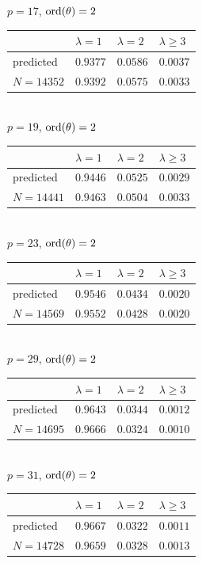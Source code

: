 \documentclass[pdflatex,sn-mathphys-num]{sn-jnl}%
\theoremstyle{plain}
\theoremstyle{definition}
\theoremstyle{remark}
\numberwithin{equation}{section}
\newcommand{\ord}{\text{\rm ord}}
\begin{document}
\noindent $p=17$, $\ord(\theta)=2$\\
\begin{tabular}{|l|l|l|l|} \hline
 & $\lambda=1$ & $\lambda=2$ & $\lambda \geq 3$ \\ \hline
predicted & $0.9377$ & $0.0586$ & $0.0037$ \\ \hline
$N=14352$ & $0.9392$ & $0.0575$ & $0.0033$ \\ \hline
\end{tabular}\\

\noindent $p=19$, $\ord(\theta)=2$\\
\begin{tabular}{|l|l|l|l|} \hline
 & $\lambda=1$ & $\lambda=2$ & $\lambda \geq 3$ \\ \hline
predicted &  $0.9446$ & $0.0525$ & $0.0029$ \\ \hline
$N=14441$ & $0.9463$ & $0.0504$ & $0.0033$ \\ \hline
\end{tabular}\\

\noindent $p=23$, $\ord(\theta)=2$\\
\begin{tabular}{|l|l|l|l|} \hline
 & $\lambda=1$ & $\lambda=2$ & $\lambda \geq 3$ \\ \hline
predicted &  $0.9546$ & $0.0434$ & $0.0020$ \\ \hline
$N=14569$ &  $0.9552$ & $0.0428$ & $0.0020$\\ \hline
\end{tabular}\\

\noindent $p=29$, $\ord(\theta)=2$\\
\begin{tabular}{|l|l|l|l|} \hline
 & $\lambda=1$ & $\lambda=2$ & $\lambda \geq 3$ \\ \hline
predicted &  $0.9643$ & $0.0344$ & $0.0012$ \\ \hline
$N=14695$ & $0.9666$ & $0.0324$ & $0.0010$ \\ \hline
\end{tabular}\\

\noindent $p=31$, $\ord(\theta)=2$\\
\begin{tabular}{|l|l|l|l|} \hline
 & $\lambda=1$ & $\lambda=2$ & $\lambda \geq 3$ \\ \hline
predicted &  $0.9667$ & $0.0322$ & $0.0011$ \\ \hline
 $N=14728$ & $0.9659$ & $0.0328$ & $0.0013$\\ \hline
\end{tabular}\\
\end{document}
